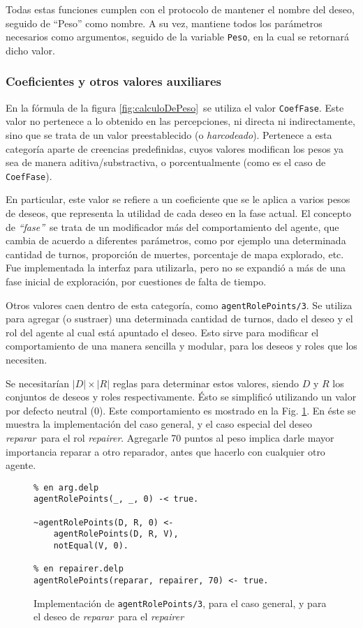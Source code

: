 \documentclass[oneside]{book}
\begin{document}
Todas estas funciones cumplen con el protocolo de mantener el nombre del deseo,
seguido de ``Peso'' como nombre. A su vez, mantiene todos los parámetros 
necesarios como argumentos, seguido de la variable \texttt{Peso}, en la cual se 
retornará dicho valor.

\subsubsection{Coeficientes y otros valores auxiliares}

En la fórmula de la figura \ref{fig:calculoDePeso}\ se utiliza el valor 
\texttt{CoefFase}. Este valor no pertenece a lo obtenido en las percepciones, ni
directa ni indirectamente, sino que se trata de un valor preestablecido (o
\textit{harcodeado}). Pertenece a esta categoría aparte de creencias predefinidas,
cuyos valores modifican los pesos ya sea de manera aditiva/substractiva, o 
porcentualmente (como es el caso de \texttt{CoefFase}).

En particular, este valor se refiere a un coeficiente que se le aplica a varios
pesos de deseos, que representa la utilidad de cada deseo en la fase actual. El 
concepto de \textit{``fase''}\ se trata de un modificador más del comportamiento
del agente, que cambia de acuerdo a diferentes parámetros, como por ejemplo una
determinada cantidad de turnos, proporción de muertes, porcentaje de mapa explorado,
etc. Fue implementada la interfaz para utilizarla, pero no se expandió a más de una
fase inicial de exploración, por cuestiones de falta de tiempo.

Otros valores caen dentro de esta categoría, como \texttt{agentRolePoints/3}.
Se utiliza para agregar (o sustraer) una determinada cantidad de turnos, dado el
deseo y el rol del agente al cual está apuntado el deseo. Esto sirve para modificar el 
comportamiento de una manera sencilla y modular, para los deseos y roles que los 
necesiten.

Se necesitarían $|D| \times |R|$ reglas para determinar estos valores, siendo $D$
y $R$ los conjuntos de deseos y roles respectivamente. Ésto se simplificó utilizando
un valor por defecto neutral ($0$). Este comportamiento es mostrado
en la Fig. \ref{fig:agentRolePoints}. En éste se muestra la implementación del caso
general, y el caso especial del deseo \emph{reparar}\ para el rol \emph{repairer}.
Agregarle 70 puntos al peso implica darle mayor importancia reparar a otro reparador,
antes que hacerlo con cualquier otro agente.

\begin{figure}
\begin{verbatim}
% en arg.delp
agentRolePoints(_, _, 0) -< true.
	
~agentRolePoints(D, R, 0) <- 
	agentRolePoints(D, R, V),
	notEqual(V, 0).
    
% en repairer.delp
agentRolePoints(reparar, repairer, 70) <- true.
\end{verbatim}
\caption{Implementación de \texttt{agentRolePoints/3}, para el caso general, y para el 
deseo de \emph{reparar}\ para el \emph{repairer}}
\label{fig:agentRolePoints}
\end{figure}
\end{document}
